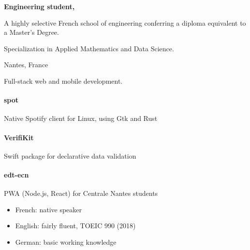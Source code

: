 \documentclass{cv}
\begin{document}
\begin{minipage}[t]{.65\textwidth}
\begin{expbox}[title={2016 -- 2019}]
\begin{minipage}[t]{0.8\textwidth}
	\textbf{Engineering student, \ecn{}}\smallskip

	A highly selective French school of engineering conferring a diploma equivalent to a Master’s Degree. 

	Specialization in Applied Mathematics and Data Science.
	\end{minipage}

\end{expbox}

\end{minipage}
\hfill
\begin{minipage}[t]{0.28\textwidth}%


	 Nantes, France
	\newline{} %
	\newline{} \href{mailto:%
	}{\link{%
	}}%
	\newline{} \href{https://github.com/xou816}{} 



	Full-stack web and mobile development.

	\begin{center}
		  
		  
		  
		  
		  
	\end{center}

	\raggedright
	\paragraph{ spot} Native Spotify client for Linux, using Gtk and Rust
	\paragraph{ VerifiKit} Swift package for declarative data validation
	\paragraph{ edt-ecn} PWA (Node.js, React) for Centrale Nantes students



	\begin{itemize}
	\setlength\itemsep{0pt}
	\item French: native speaker
	\item English: fairly fluent, TOEIC 990 (2018)
	\item German: basic working knowledge
	\end{itemize}
		
\end{minipage}
\end{document}
